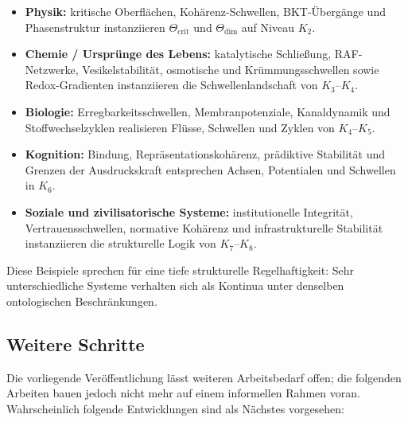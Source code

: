 \begin{itemize}
    \item \textbf{Physik:} kritische Oberflächen, Kohärenz-Schwellen,
          BKT-Übergänge und Phasenstruktur instanziieren
          \(\Theta_{\mathrm{crit}}\) und \(\Theta_{\mathrm{dim}}\) auf Niveau
          \(K_2\).
    \item \textbf{Chemie / Ursprünge des Lebens:} katalytische Schließung,
          RAF-Netzwerke, Vesikelstabilität, osmotische und Krümmungsschwellen
          sowie Redox-Gradienten instanziieren die Schwellenlandschaft von
          \(K_3\)–\(K_4\).
    \item \textbf{Biologie:} Erregbarkeitsschwellen, Membranpotenziale,
          Kanaldynamik und Stoffwechselzyklen realisieren Flüsse, Schwellen und
          Zyklen von \(K_4\)–\(K_5\).
    \item \textbf{Kognition:} Bindung, Repräsentationskohärenz, prädiktive
          Stabilität und Grenzen der Ausdruckskraft entsprechen Achsen,
          Potentialen und Schwellen in \(K_6\).
    \item \textbf{Soziale und zivilisatorische Systeme:} institutionelle
          Integrität, Vertrauensschwellen, normative Kohärenz und
          infrastrukturelle Stabilität instanziieren die strukturelle Logik von
          \(K_7\)–\(K_8\).
\end{itemize}

Diese Beispiele sprechen für eine tiefe strukturelle Regelhaftigkeit:
Sehr unterschiedliche Systeme verhalten sich als Kontinua unter denselben
ontologischen Beschränkungen.

\subsection{Weitere Schritte}

Die vorliegende Veröffentlichung lässt weiteren Arbeitsbedarf offen; die
folgenden Arbeiten bauen jedoch nicht mehr auf einem informellen
Rahmen voran.
Wahrscheinlich folgende Entwicklungen sind als Nächstes vorgesehen:

